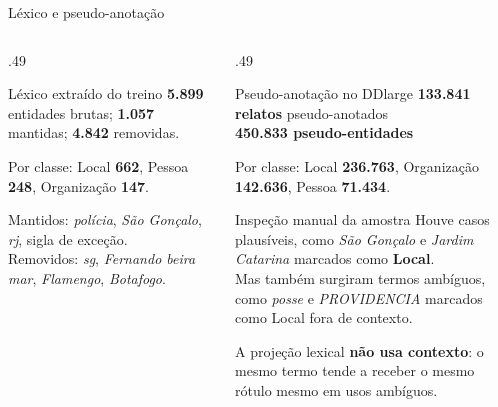 \documentclass[aspectratio=169, 9pt]{beamer}
\begin{document}
\begin{frame}{Léxico e pseudo-anotação}
  \begin{columns}[T]
    \begin{column}{.49\textwidth}
      \begin{block}{Léxico extraído do treino}
        \small
        \textbf{5.899} entidades brutas; \textbf{1.057} mantidas; \textbf{4.842} removidas.

        \vspace{4pt}
        Por classe: Local \textbf{662}, Pessoa \textbf{248}, Organização \textbf{147}.

        \vspace{4pt}
        Mantidos: \textit{polícia}, \textit{São Gonçalo}, \textit{rj}, sigla de exceção.\\
        Removidos: \textit{sg}, \textit{Fernando beira mar}, \textit{Flamengo}, \textit{Botafogo}.
      \end{block}
    \end{column}

    \begin{column}{.49\textwidth}
      \begin{exampleblock}{Pseudo-anotação no DDlarge}
        \small
        \textbf{133.841 relatos} pseudo-anotados\\
        \textbf{450.833 pseudo-entidades}

        \vspace{4pt}
        Por classe: Local \textbf{236.763}, Organização \textbf{142.636}, Pessoa \textbf{71.434}.
      \end{exampleblock}

      \begin{alertblock}{Inspeção manual da amostra}
        \small
        Houve casos plausíveis, como \textit{São Gonçalo} e \textit{Jardim Catarina} marcados como \textbf{Local}.\\[2pt]
        Mas também surgiram termos ambíguos, como \textit{posse} e \textit{PROVIDENCIA} marcados como Local fora de contexto.
      \end{alertblock}

      \vspace{3pt}
      \small
      A projeção lexical \textbf{não usa contexto}: o mesmo termo tende a receber o mesmo rótulo mesmo em usos ambíguos.
    \end{column}
  \end{columns}
\end{frame}
\end{document}
